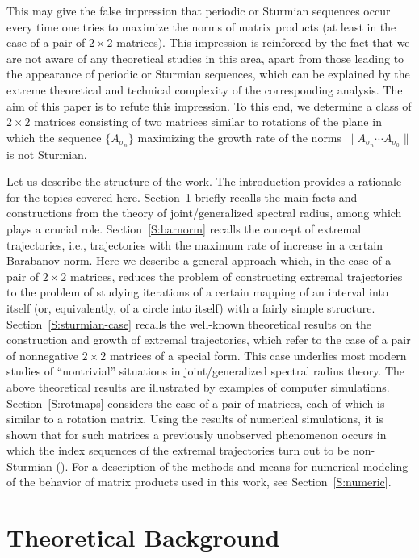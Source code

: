 \documentclass[a4paper,10pt,reqno]{amsart}
\begin{document}
This may give the false impression that periodic or Sturmian sequences occur
every time one tries to maximize the norms of matrix products (at least in
the case of a pair of ${2\times2}$ matrices). This impression is reinforced
by the fact that we are not aware of any theoretical studies in this area,
apart from those leading to the appearance of periodic or Sturmian sequences,
which can be explained by the extreme theoretical and technical complexity of
the corresponding analysis. The aim of this paper is to refute this
impression. To this end, we determine a class of ${2\times2}$ matrices
consisting of two matrices similar to rotations of the plane in which the
sequence $\{A_{\sigma_{n}}\}$ maximizing the growth rate of the norms
$\|A_{\sigma_{n}}\cdots A_{\sigma_{0}}\|$ is not Sturmian.

Let us describe the structure of the work. The introduction provides a
rationale for the topics covered here. Section~\ref{S:background} briefly
recalls the main facts and constructions from the theory of joint/generalized
spectral radius, among which  plays a crucial role.
Section~\ref{S:barnorm} recalls the concept of extremal trajectories, i.e.,
trajectories with the maximum rate of increase in a certain Barabanov norm.
Here we describe a general approach which, in the case of a pair of
${2\times2}$ matrices, reduces the problem of constructing extremal
trajectories to the problem of studying iterations of a certain mapping of an
interval into itself (or, equivalently, of a circle into itself) with a
fairly simple structure. Section~\ref{S:sturmian-case} recalls the well-known
theoretical results on the construction and growth of extremal trajectories,
which refer to the case of a pair of nonnegative ${2\times2}$ matrices of a
special form. This case underlies most modern studies of ``nontrivial''
situations in joint/generalized spectral radius theory. The above theoretical
results are illustrated by examples of computer simulations.
Section~\ref{S:rotmaps} considers the case of a pair of matrices, each of
which is similar to a rotation matrix. Using the results of numerical
simulations, it is shown that for such matrices a previously unobserved
phenomenon occurs in which the index sequences of the extremal trajectories
turn out to be non-Sturmian (). For a description of the
methods and means for numerical modeling of the behavior of matrix products
used in this work, see Section~\ref{S:numeric}.

\section{Theoretical Background}\label{S:background}
\end{document}
